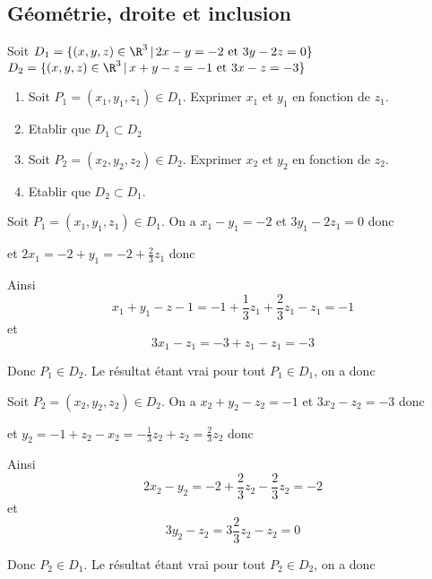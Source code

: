 \subsection{Géométrie, droite et inclusion}

\begin{exercice}
Soit $D_1 = \{ (x,y,z) \in \R^3 \, |\, 2x-y=-2 \text{ et } 3y -2z=0\}$
$D_2 = \{ (x,y,z) \in \R^3 \, |\, x+y-z=-1 \text{ et } 3x -z=-3\}$

\begin{enumerate}
\item Soit $P_1=(x_1,y_1,z_1)\in D_1$. Exprimer $x_1$ et $y_1$ en fonction de $z_1$. 
\item Etablir que $D_1\subset D_2$
\item Soit $P_2=(x_2,y_2,z_2)\in D_2$. Exprimer $x_2$ et $y_2$ en fonction de $z_2$. 
\item Etablir que $D_2\subset D_1$. 
\end{enumerate}

\end{exercice}

\begin{correction}
Soit $P_1 =(x_1,y_1,z_1)\in D_1$. On a 
$x_1-y_1 =-2$ et $3y_1-2z_1= 0$ donc 
\begin{center}
\end{center}
et  $2x_1 =-2 +y_1 = -2 + \frac{2}{3}z_1$
donc 
\begin{center}
\end{center}
Ainsi 
$$x_1+y_1-z-1= -1 + \frac{1}{3}z_1 + \frac{2}{3}z_1 -z_1=-1$$
et 
$$3x_1-z_1 = -3 +z_1-z_1=-3$$

Donc $P_1 \in D_2$. Le résultat étant vrai pour tout $P_1 \in D_1$, on a donc 

\begin{center}

\end{center}


Soit $P_2 =(x_2,y_2,z_2)\in D_2$. On a 
$x_2+y_2 -z_2=-1$ et $3x_2-z_2= -3$ donc 
\begin{center}

\end{center}

et  $y_2 =-1+z_2-x_2 = -\frac{1}{3}z_2+z_2=\frac{2}{3}z_2$
donc 
\begin{center}

\end{center}


Ainsi 
$$2x_2-y_2 = -2 +\frac{2}{3}z_2-\frac{2}{3}z_2 =-2$$
et 
$$3y_2-z_2 = 3 \frac{2}{3}z_2 -z_2=0$$

Donc $P_2 \in D_1$. Le résultat étant vrai pour tout $P_2 \in D_2$, on a donc 

\begin{center}

\end{center}
\end{correction}